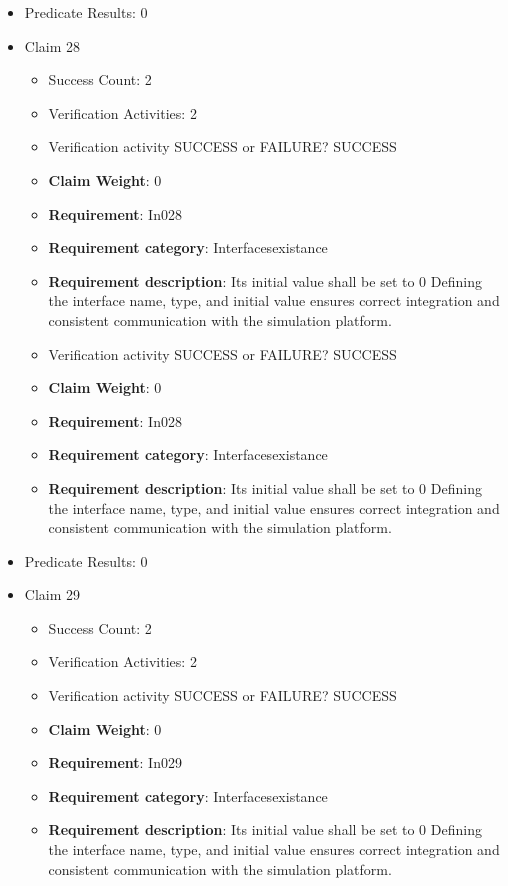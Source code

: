 \documentclass{article}
\begin{document}
\begin{itemize}
									    
				\item Predicate Results: 0

  				  \item Claim 28
				\begin{itemize}
			    	\item Success Count: 2 
			    	\item Verification Activities: 2
					\item Verification activity SUCCESS or FAILURE? SUCCESS
					\item \textbf{Claim Weight}: 0
						\item \textbf{Requirement}: In028 
						\item \textbf{Requirement category}: Interfacesexistance 
						\item \textbf{Requirement description}: Its initial value shall be set to 0 Defining the interface name, type, and initial value ensures correct integration and consistent communication with the simulation platform.
					
					\item Verification activity SUCCESS or FAILURE? SUCCESS
					\item \textbf{Claim Weight}: 0
						\item \textbf{Requirement}: In028 
						\item \textbf{Requirement category}: Interfacesexistance 
						\item \textbf{Requirement description}: Its initial value shall be set to 0 Defining the interface name, type, and initial value ensures correct integration and consistent communication with the simulation platform.
					
				\end{itemize}
				
									    
				\item Predicate Results: 0

  				  \item Claim 29
				\begin{itemize}
			    	\item Success Count: 2 
			    	\item Verification Activities: 2
					\item Verification activity SUCCESS or FAILURE? SUCCESS
					\item \textbf{Claim Weight}: 0
						\item \textbf{Requirement}: In029 
						\item \textbf{Requirement category}: Interfacesexistance 
						\item \textbf{Requirement description}: Its initial value shall be set to 0 Defining the interface name, type, and initial value ensures correct integration and consistent communication with the simulation platform.
					

\end{itemize}
\end{itemize}
\end{document}
